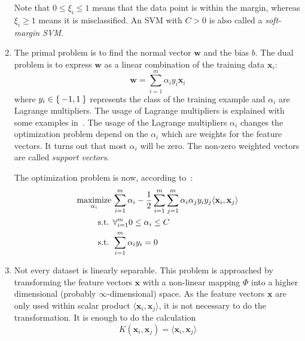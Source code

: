 \begin{enumerate}
          Note that \(0 \le \xi_i \le 1\) means that the data point is within
          the margin, whereas \(\xi_i \ge 1\) means it is misclassified. An
          \gls{SVM} with $C > 0$ is also called a \textit{soft-margin \gls{SVM}}.
    \item The primal problem is to find the normal vector $\mathbf{w}$ and the
          bias $b$. The dual problem is to express $\mathbf{w}$ as a linear
          combination of the training data $\mathbf{x}_i$:
          \[\mathbf{w} = \sum_{i=1}^m \alpha_i y_i \mathbf{x}_i\]
          where $y_i \in \Set{-1, 1}$ represents the class of the training
          example and $\alpha_i$ are Lagrange multipliers. The usage of
          Lagrange multipliers is explained with some examples
          in~\cite{smithlagrange}. The usage of the Lagrange multipliers
          $\alpha_i$ changes the optimization problem depend on the
          $\alpha_i$ which are weights for the feature vectors. It turns
          out that most $\alpha_i$ will be zero. The non-zero weighted vectors
          are called \textit{support vectors}.

          The optimization problem is now, according to~\cite{burges1998tutorial}:
          \begin{equation*}
          \begin{aligned}
              \operatorname*{maximize}_{\alpha_i}\,& \sum_{i=1}^m \alpha_i - \frac{1}{2} \sum_{i=1}^m \sum_{j=1}^m \alpha_i \alpha_j y_i y_j \langle \mathbf{x}_i, \mathbf{x}_j \rangle\\
              \text{s.t. } & \forall_{i=1}^m 0 \leq \alpha_i \leq C\\
              \text{s.t. } & \sum_{i=1}^m \alpha_i y_i = 0
          \end{aligned}
          \end{equation*}
    \item Not every dataset is linearly separable. This problem is approached
          by transforming the feature vectors $\mathbf{x}$ with a non-linear
          mapping $\Phi$ into a higher dimensional (probably
          $\infty$-dimensional) space. As the feature vectors $\mathbf{x}$
          are only used within scalar product
          $\langle \mathbf{x}_i, \mathbf{x}_j \rangle$, it is not necessary to
          do the transformation. It is enough to do the calculation
          \[K(\mathbf{x}_i, \mathbf{x}_j) = \langle \mathbf{x}_i, \mathbf{x}_j \rangle\]


\end{enumerate}
